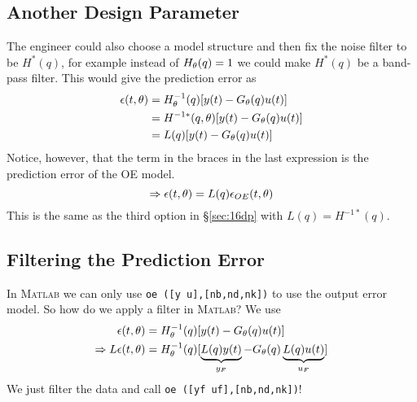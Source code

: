 \subsection{Another Design Parameter}
The engineer could also choose a model structure and then fix the noise filter to be $H^\ast(q)$, for example instead of $H_\theta(q)=1$ we could make $H^\ast(q)$ be a band-pass filter.
This would give the prediction error as
\begin{align*}
\epsilon(t,\theta) &= H_\theta^{-1} (q)[y(t)-G_\theta(q) u(t)] \\
&= H^{-1\ast}(q,\theta)[y(t) - G_\theta(q) u(t)] \\
&= L(q)[y(t) - G_\theta(q) u(t)]
\end{align*}
Notice, however, that the term in the braces in the last expression is the prediction error of the OE model.
$$\Rightarrow \epsilon(t,\theta) = L(q)\epsilon_{OE}(t,\theta)$$
This is the same as the third option in \S\ref{sec:16dp} with $L(q)=H^{-1\ast}(q)$.

\subsection{Filtering the Prediction Error}
In \textsc{Matlab} we can only use \texttt{oe ([y u],[nb,nd,nk])} to use the output error model.
So how do we apply a filter in \textsc{Matlab}? We use
\begin{align*}
\epsilon(t,\theta) &= H_\theta^{-1} (q)[y(t)-G_\theta(q) u(t)] \\
\Rightarrow L\epsilon(t,\theta) &= H_\theta^{-1} (q)[\underbrace{L(q)y(t)}_{y_F} - G_\theta(q) \underbrace{L(q)u(t)}_{u_F}]
\end{align*}
We just filter the data and call \texttt{oe ([yf uf],[nb,nd,nk])}!

